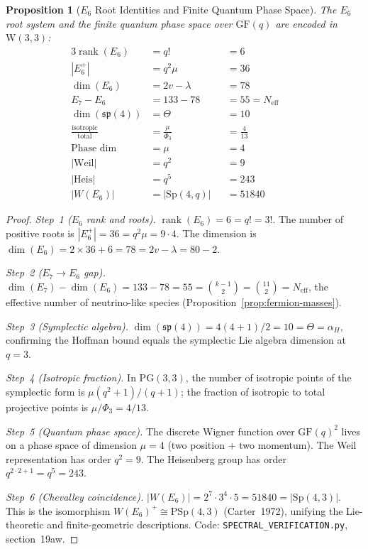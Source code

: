 \documentclass[12pt,a4paper]{article}
\newtheorem{proposition}[theorem]{Proposition}
\newcommand{\W}{\mathrm{W}(3,3)}
\begin{document}

\begin{proposition}[$E_6$ Root Identities and Finite Quantum Phase Space]
\label{prop:e6-qps}
The $E_6$ root system and the finite quantum phase space over
$\mathrm{GF}(q)$ are encoded in $\W$:
\begin{alignat*}{3}
  \operatorname{rank}(E_6) &= q! &&= 6 &\;& \\
  |E_6^+| &= q^2\mu &&= 36 && \\
  \dim(E_6) &= 2v - \lambda &&= 78 && \\
  E_7 - E_6 &= 133 - 78 &&= 55 = N_{\mathrm{eff}} && \\
  \dim(\mathfrak{sp}(4)) &= \Theta &&= 10 && \\
  \frac{\text{isotropic}}{\text{total}} &= \frac{\mu}{\Phi_3}
    &&= \frac{4}{13} && \\
  \text{Phase dim} &= \mu &&= 4 && \\
  |\mathrm{Weil}| &= q^2 &&= 9 && \\
  |\mathrm{Heis}| &= q^5 &&= 243 && \\
  |W(E_6)| &= |\mathrm{Sp}(4,q)| &&= 51840 &&
\end{alignat*}
\end{proposition}

\begin{proof}
\emph{Step~1 ($E_6$ rank and roots).}
$\operatorname{rank}(E_6) = 6 = q! = 3!$.
The number of positive roots is $|E_6^+| = 36 = q^2\mu = 9 \cdot 4$.
The dimension is $\dim(E_6) = 2 \times 36 + 6 = 78 = 2v - \lambda
= 80 - 2$.

\emph{Step~2 ($E_7 \to E_6$ gap).}
$\dim(E_7) - \dim(E_6) = 133 - 78 = 55 = \binom{k-1}{2}
= \binom{11}{2} = N_{\mathrm{eff}}$,
the effective number of neutrino-like species
(Proposition~\ref{prop:fermion-masses}).

\emph{Step~3 (Symplectic algebra).}
$\dim(\mathfrak{sp}(4)) = 4(4+1)/2 = 10 = \Theta = \alpha_H$,
confirming the Hoffman bound equals the symplectic Lie algebra
dimension at $q = 3$.

\emph{Step~4 (Isotropic fraction).}
In $\mathrm{PG}(3,3)$, the number of isotropic points of the
symplectic form is $\mu(q^2+1)/(q+1)$; the fraction of isotropic
to total projective points is $\mu/\Phi_3 = 4/13$.

\emph{Step~5 (Quantum phase space).}
The discrete Wigner function over $\mathrm{GF}(q)^2$ lives on
a phase space of dimension $\mu = 4$ (two position $+$ two momentum).
The Weil representation has order $q^2 = 9$.
The Heisenberg group has order $q^{2 \cdot 2 + 1} = q^5 = 243$.

\emph{Step~6 (Chevalley coincidence).}
$|W(E_6)| = 2^7 \cdot 3^4 \cdot 5 = 51840 = |\mathrm{Sp}(4,3)|$.
This is the isomorphism $W(E_6)^+ \cong \mathrm{PSp}(4,3)$ (Carter~1972),
unifying the Lie-theoretic and finite-geometric descriptions.
Code: \texttt{SPECTRAL\_VERIFICATION.py}, section~19aw.
\end{proof}
\end{document}
